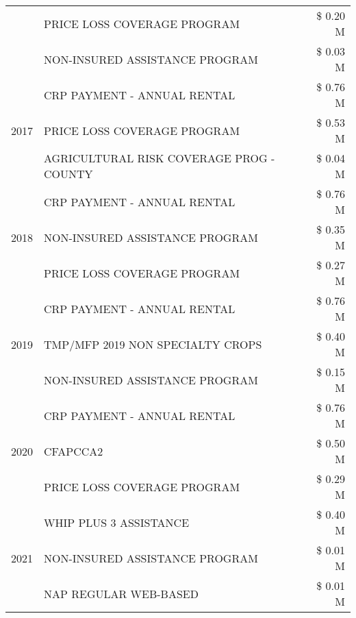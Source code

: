 \begin{tabular}{llr}
 & PRICE LOSS COVERAGE PROGRAM                   & \$ 0.20 M \\
 & NON-INSURED ASSISTANCE PROGRAM                & \$ 0.03 M \\
\cline{1-3}
\multirow[t]{3}{*}{2017} & CRP PAYMENT - ANNUAL RENTAL & \$ 0.76 M \\
 & PRICE LOSS COVERAGE PROGRAM & \$ 0.53 M \\
 & AGRICULTURAL RISK COVERAGE PROG - COUNTY & \$ 0.04 M \\
\cline{1-3}
\multirow[t]{3}{*}{2018} & CRP PAYMENT - ANNUAL RENTAL & \$ 0.76 M \\
 & NON-INSURED ASSISTANCE PROGRAM & \$ 0.35 M \\
 & PRICE LOSS COVERAGE PROGRAM & \$ 0.27 M \\
\cline{1-3}
\multirow[t]{3}{*}{2019} & CRP PAYMENT - ANNUAL RENTAL & \$ 0.76 M \\
 & TMP/MFP 2019 NON SPECIALTY CROPS & \$ 0.40 M \\
 & NON-INSURED ASSISTANCE PROGRAM & \$ 0.15 M \\
\cline{1-3}
\multirow[t]{3}{*}{2020} & CRP PAYMENT - ANNUAL RENTAL & \$ 0.76 M \\
 & CFAPCCA2 & \$ 0.50 M \\
 & PRICE LOSS COVERAGE PROGRAM & \$ 0.29 M \\
\cline{1-3}
\multirow[t]{3}{*}{2021} & WHIP PLUS 3 ASSISTANCE & \$ 0.40 M \\
 & NON-INSURED ASSISTANCE PROGRAM & \$ 0.01 M \\
 & NAP REGULAR WEB-BASED & \$ 0.01 M \\
\cline{1-3}
\bottomrule
\end{tabular}
